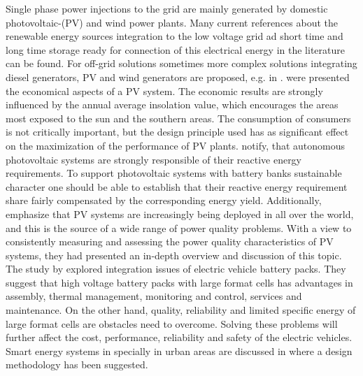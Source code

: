     Single phase power injections to the grid are mainly generated by domestic photovoltaic-(PV) and wind power plants. Many current references about the renewable energy sources
    integration to the low voltage grid ad short time and long time storage ready for connection of this electrical energy in the literature can be found. For off-grid solutions sometimes more complex solutions integrating diesel generators, PV and wind generators are proposed, e.g. in \cite{shezan2016}.
    \cite{cucchiella2013environmental} were presented the economical aspects of a PV system. The economic results are strongly influenced by the annual average insolation value,
    which encourages the areas most exposed to the sun and the southern areas. The consumption of consumers is not critically important, but the design principle used has as
    significant effect on the maximization of the performance of PV plants. \cite{kaldellis2009optimum} notify, that autonomous photovoltaic systems are strongly
    responsible of their reactive energy requirements. To support photovoltaic systems with battery banks sustainable character one should be able to establish that their reactive energy
    requirement share fairly compensated by the corresponding energy yield.  Additionally, \cite{ortega2013measurement} emphasize that PV systems are increasingly
    being deployed in all over the world, and this is the source of a wide range of power quality problems. With a view to consistently measuring and assessing the power quality characteristics of PV
    systems, they had presented an in-depth overview and discussion of this topic. The study by \cite{huat2015integration} explored integration issues of electric vehicle battery packs. They suggest that high voltage battery packs with large format cells has advantages in assembly, thermal management, monitoring and control, services and maintenance. On the other hand, quality, reliability and limited specific energy of large format cells are obstacles need to overcome. Solving these problems will further affect the cost, performance, reliability and safety of the electric vehicles. Smart energy systems in specially in urban areas are discussed in \cite{Lund2015} where a design methodology has been suggested.

